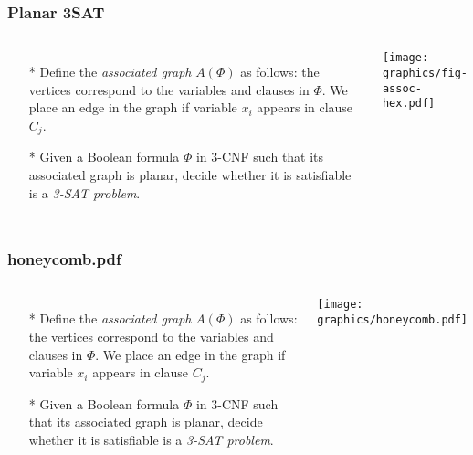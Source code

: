 \documentclass{beamer}
\begin{document}
\begin{frame} \frametitle{Planar 3SAT}
    \begin{columns}[c]
        \begin{itemize}
            \item[*] Define the \textit{associated graph} $A(\Phi)$ as follows: the vertices correspond to the variables and clauses in $\Phi$.   
We place an edge in the graph if variable $x_i$ appears in clause $C_j$.
            \item[*] Given a Boolean formula $\Phi$ in 3-CNF such that its associated graph is planar, decide whether it 
is satisfiable is a \textit{3-SAT problem}.
        \end{itemize}
        \begin{minipage}{\linewidth}
            \begin{center}
            \texttt{[image: graphics/fig-assoc-hex.pdf]}
            \label{gfx:fig-assoc-hex.pdf}
            \end{center}
        \end{minipage}
    \end{columns}
\end{frame}

\begin{frame} \frametitle{honeycomb.pdf}
    \begin{columns}[c]
        \begin{itemize}
            \item[*] Define the \textit{associated graph} $A(\Phi)$ as follows: the vertices correspond to the variables and clauses in $\Phi$.   
We place an edge in the graph if variable $x_i$ appears in clause $C_j$.
            \item[*] Given a Boolean formula $\Phi$ in 3-CNF such that its associated graph is planar, decide whether it 
is satisfiable is a \textit{3-SAT problem}.
        \end{itemize}
        \begin{minipage}{\linewidth}
            \begin{center}
            \texttt{[image: graphics/honeycomb.pdf]}
            \label{gfx:honeycomb.pdf}
            \end{center}
        \end{minipage}
    \end{columns}
\end{frame}
\end{document}
